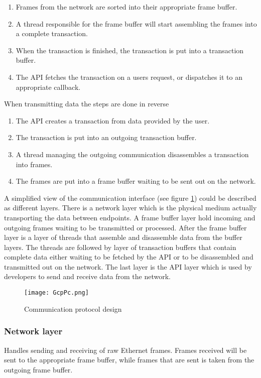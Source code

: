 \begin{enumerate}
\item Frames from the network are sorted into their appropriate frame buffer.
\item A thread responsible for the frame buffer will start assembling the frames into a complete transaction.
\item When the transaction is finished, the transaction is put into a transaction buffer.
\item The API fetches the transaction on a users request, or dispatches it to an appropriate callback.
\end{enumerate}

When transmitting data the steps are done in reverse

\begin{enumerate}
\item The API creates a transaction from data provided by the user.
\item The transaction is put into an outgoing transaction buffer.
\item A thread managing the outgoing communication disassembles a transaction into frames.
\item The frames are put into a frame buffer waiting to be sent out on the network.
\end{enumerate}

A simplified view of the communication interface (see figure \ref{fig:GcpPc}) could be described as different layers. There is a network layer which is the physical medium actually transporting the data between endpoints. A frame buffer layer hold incoming and outgoing frames waiting to be transmitted or processed. After the frame buffer layer is a layer of threads that assemble and disassemble data from the buffer layers. The threads are followed by layer of transaction buffers that contain complete data either waiting to be fetched by the API or to be disassembled and transmitted out on the network. The last layer is the API layer which is used by developers to send and receive data from the network.

\begin{figure}
\centering
\texttt{[image: GcpPc.png]}
\caption{Communication protocol design}
\label{fig:GcpPc}
\end{figure}

\subsubsection{Network layer}
Handles sending and receiving of raw Ethernet frames. Frames received will be sent to the appropriate frame buffer, while frames that are sent is taken from the outgoing frame buffer.
